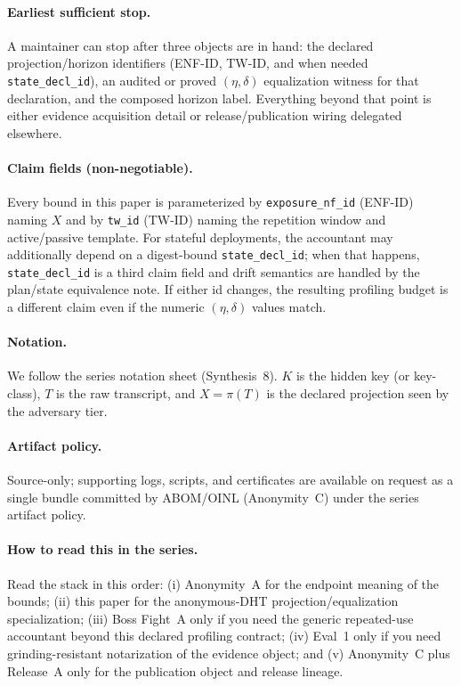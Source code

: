 \documentclass[11pt]{article}
\begin{document}
\paragraph{Earliest sufficient stop.}
A maintainer can stop after three objects are in hand: the declared projection/horizon identifiers (ENF-ID, TW-ID, and when needed \texttt{state\_decl\_id}), an audited or proved $(\eta,\delta)$ equalization witness for that declaration, and the composed horizon label.
Everything beyond that point is either evidence acquisition detail or release/publication wiring delegated elsewhere.

\paragraph{Claim fields (non-negotiable).}
Every bound in this paper is parameterized by \texttt{exposure\_nf\_id} (ENF-ID) naming $X$ and by \texttt{tw\_id} (TW-ID) naming the repetition window and active/passive template. For stateful deployments, the accountant may additionally depend on a digest-bound \texttt{state\_decl\_id}; when that happens, \texttt{state\_decl\_id} is a third claim field and drift semantics are handled by the plan/state equivalence note.\cite{series:planstateequiv}
If either id changes, the resulting profiling budget is a different claim even if the numeric $(\eta,\delta)$ values match.\cite{series:traceifaces,series:threatwindows}

\paragraph{Notation.}
We follow the series notation sheet (Synthesis~8).\cite{series:notation}
$K$ is the hidden key (or key-class), $T$ is the raw transcript, and $X=\pi(T)$ is the declared projection seen by the adversary tier.

\paragraph{Artifact policy.}
Source-only; supporting logs, scripts, and certificates are available on request as a single bundle committed by ABOM/OINL (Anonymity~C) under the series artifact policy.\cite{series:abomoinl,series:artifactpolicy}

\paragraph{How to read this in the series.}
Read the stack in this order: (i) Anonymity~A for the endpoint meaning of the bounds; (ii) this paper for the anonymous-DHT projection/equalization specialization; (iii) Boss Fight~A only if you need the generic repeated-use accountant beyond this declared profiling contract; (iv) Eval~1 only if you need grinding-resistant notarization of the evidence object; and (v) Anonymity~C plus Release~A only for the publication object and release lineage.\cite{series:oddsinflation,series:bossfightA,series:eval1,series:abomoinl,series:releaseA}
\end{document}
